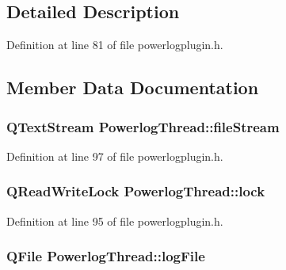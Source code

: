 \subsection{\-Detailed \-Description}


\-Definition at line 81 of file powerlogplugin.\-h.



\subsection{\-Member \-Data \-Documentation}
\hypertarget{class_powerlog_thread_a3c63539ac0a8a7b720cfb346591a1a7a}{
\subsubsection[{file\-Stream}]{\setlength{\rightskip}{0pt plus 5cm}\-Q\-Text\-Stream {\bf \-Powerlog\-Thread\-::file\-Stream}}}\label{class_powerlog_thread_a3c63539ac0a8a7b720cfb346591a1a7a}


\-Definition at line 97 of file powerlogplugin.\-h.

\hypertarget{class_powerlog_thread_a365d62f374a4aa61f14a3a505fd76414}{
\subsubsection[{lock}]{\setlength{\rightskip}{0pt plus 5cm}\-Q\-Read\-Write\-Lock {\bf \-Powerlog\-Thread\-::lock}}}\label{class_powerlog_thread_a365d62f374a4aa61f14a3a505fd76414}


\-Definition at line 95 of file powerlogplugin.\-h.

\hypertarget{class_powerlog_thread_a62efcac44703411ff9cf47f57a7f1b86}{
\subsubsection[{log\-File}]{\setlength{\rightskip}{0pt plus 5cm}\-Q\-File {\bf \-Powerlog\-Thread\-::log\-File}}}\label{class_powerlog_thread_a62efcac44703411ff9cf47f57a7f1b86}


